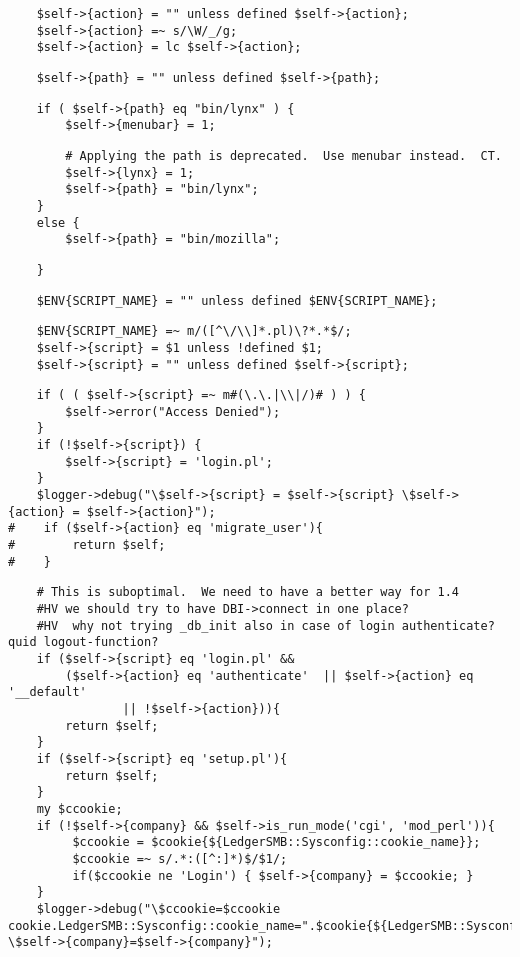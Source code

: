 \begin{verbatim}
    $self->{action} = "" unless defined $self->{action};
    $self->{action} =~ s/\W/_/g;
    $self->{action} = lc $self->{action};
\end{verbatim}
\begin{verbatim}
    $self->{path} = "" unless defined $self->{path};
\end{verbatim}
\begin{verbatim}
    if ( $self->{path} eq "bin/lynx" ) {
        $self->{menubar} = 1;
\end{verbatim}
\begin{verbatim}
        # Applying the path is deprecated.  Use menubar instead.  CT.
        $self->{lynx} = 1;
        $self->{path} = "bin/lynx";
    }
    else {
        $self->{path} = "bin/mozilla";
\end{verbatim}
\begin{verbatim}
    }
\end{verbatim}
\begin{verbatim}
    $ENV{SCRIPT_NAME} = "" unless defined $ENV{SCRIPT_NAME};
\end{verbatim}
\begin{verbatim}
    $ENV{SCRIPT_NAME} =~ m/([^\/\\]*.pl)\?*.*$/;
    $self->{script} = $1 unless !defined $1;
    $self->{script} = "" unless defined $self->{script};
\end{verbatim}
\begin{verbatim}
    if ( ( $self->{script} =~ m#(\.\.|\\|/)# ) ) {
        $self->error("Access Denied");
    }
    if (!$self->{script}) {
        $self->{script} = 'login.pl';
    }
    $logger->debug("\$self->{script} = $self->{script} \$self->{action} = $self->{action}");
#    if ($self->{action} eq 'migrate_user'){
#        return $self;
#    }
\end{verbatim}
\begin{verbatim}
    # This is suboptimal.  We need to have a better way for 1.4
    #HV we should try to have DBI->connect in one place?
    #HV  why not trying _db_init also in case of login authenticate? quid logout-function?
    if ($self->{script} eq 'login.pl' &&
        ($self->{action} eq 'authenticate'  || $self->{action} eq '__default' 
                || !$self->{action})){
        return $self;
    }
    if ($self->{script} eq 'setup.pl'){
        return $self;
    }
    my $ccookie;
    if (!$self->{company} && $self->is_run_mode('cgi', 'mod_perl')){
         $ccookie = $cookie{${LedgerSMB::Sysconfig::cookie_name}};
         $ccookie =~ s/.*:([^:]*)$/$1/;
         if($ccookie ne 'Login') { $self->{company} = $ccookie; } 
    }
    $logger->debug("\$ccookie=$ccookie cookie.LedgerSMB::Sysconfig::cookie_name=".$cookie{${LedgerSMB::Sysconfig::cookie_name}}." \$self->{company}=$self->{company}");
\end{verbatim}
